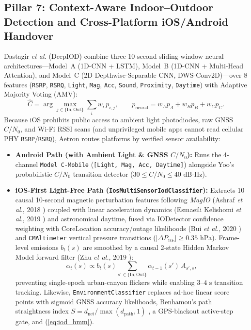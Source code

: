 \documentclass[journal]{IEEEtran}
\begin{document}
\subsection{Pillar 7: Context-Aware Indoor--Outdoor Detection and Cross-Platform iOS/Android Handover}
Dastagir \emph{et al.} (DeepIOD) \cite{dastagir2024deepiod} combine three 10-second sliding-window neural architectures---Model~A (1D-CNN + LSTM), Model~B (1D-CNN + Multi-Head Attention), and Model~C (2D Depthwise-Separable CNN, DWS-Conv2D)---over 8 features (\texttt{RSRP}, \texttt{RSRQ}, \texttt{Light}, \texttt{Mag}, \texttt{Acc}, \texttt{Sound}, \texttt{Proximity}, \texttt{Daytime}) with Adaptive Majority Voting (AMV):
\begin{equation}
  \hat{C} = \arg\max_{j \in \{\text{In},\text{Out}\}} \sum_{i} w_i \, p_{i,j}, \qquad
  p_{\text{neural}} = w_A p_A + w_B p_B + w_C p_C.
  \label{eq:deepiod_amv}
\end{equation}
Because iOS prohibits public access to ambient light photodiodes, raw GNSS $C/N_0$, and Wi-Fi RSSI scans (and unprivileged mobile apps cannot read cellular PHY \texttt{RSRP}/\texttt{RSRQ}), Aetron routes platforms by verified sensor availability:
\begin{itemize}
  \item \textbf{Android Path (with Ambient Light \& GNSS $C/N_0$):} Runs the 4-channel \texttt{Model C-Mobile} (\texttt{[Light, Mag, Acc, Daytime]}) alongside Yoo's probabilistic $C/N_0$ transition detector \cite{yoo2025seamless} ($30 \le C/N_0 \le 40\text{ dB-Hz}$).
  \item \textbf{iOS-First Light-Free Path (\texttt{IosMultiSensorIodClassifier}):} Extracts 10 causal 10-second magnetic perturbation features following \emph{MagIO} (Ashraf \emph{et al.}, 2018 \cite{ashraf2018magio}) coupled with linear acceleration dynamics (Esmaeili Kelishomi \emph{et al.}, 2019 \cite{kelishomi2019activities}) and astronomical daytime, fused via IODetector confidence weighting \cite{li2014iodetector} with CoreLocation accuracy/outage likelihoods (Bui \emph{et al.}, 2020 \cite{bui2020gpsiod}) and \texttt{CMAltimeter} vertical pressure transitions ($|\Delta P_{10\text{s}}| \ge 0.35\text{ hPa}$). Frame-level emissions $b_t(s)$ are smoothed by a causal 2-state Hidden Markov Model forward filter (Zhu \emph{et al.}, 2019 \cite{zhu2019fast}):
\begin{equation}
  \alpha_t(s) \propto b_t(s) \sum_{s' \in \{\text{In},\text{Out}\}} \alpha_{t-1}(s')\, A_{s',s},
  \label{eq:iod_hmm}
\end{equation}
  preventing single-epoch urban-canyon flickers while enabling $3\text{--}4\text{ s}$ transition tracking. Likewise, \texttt{EnvironmentClassifier} replaces ad-hoc linear score points with sigmoid GNSS accuracy likelihoods, Benhamou's path straightness index $S = d_{\text{net}}/\max(d_{\text{path}}, 1)$ \cite{benhamou2004tortuosity}, a GPS-blackout active-step gate, and (\ref{eq:iod_hmm}).
\end{itemize}
\end{document}
